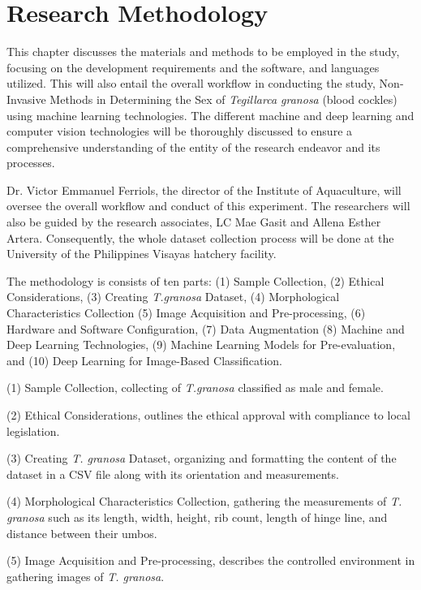 \chapter{Research Methodology}
\label{sec:methodology}

This chapter discusses the materials and methods to be employed in the study, focusing on the development requirements and the software, and languages utilized. This will also entail the overall workflow in conducting the study, Non-Invasive Methods in Determining the Sex of \textit{Tegillarca granosa} (blood cockles) using machine learning technologies. The different machine and deep learning and computer vision technologies will be thoroughly discussed to ensure a comprehensive understanding of the entity of the research endeavor and its processes. 

Dr. Victor Emmanuel Ferriols, the director of the Institute of Aquaculture, will oversee the overall workflow and conduct of this experiment. The researchers will also be guided by the research associates, LC Mae Gasit and Allena Esther Artera. Consequently, the whole dataset collection process will be done at the University of the Philippines Visayas hatchery facility. 

The methodology is consists of ten parts: (1) Sample Collection, (2) Ethical Considerations, (3) Creating \textit{T.granosa} Dataset, (4) Morphological Characteristics Collection (5) Image Acquisition and Pre-processing, (6) Hardware and Software Configuration, (7) Data Augmentation (8) Machine and Deep Learning Technologies, (9) Machine Learning Models for Pre-evaluation, and (10) Deep Learning for Image-Based Classification. 

(1) Sample Collection, collecting of \textit{T.granosa} classified as male and female. 

(2) Ethical Considerations, outlines the ethical approval with compliance to local legislation. 

(3) Creating \textit{T. granosa} Dataset, organizing and formatting the content of the dataset in a CSV file along with its orientation and measurements. 

(4) Morphological Characteristics Collection, gathering the measurements of \textit{T. granosa} such as its length, width, height, rib count, length of hinge line, and distance between their umbos. 

(5) Image Acquisition and Pre-processing, describes the controlled environment in gathering images of \textit{T. granosa}. 

